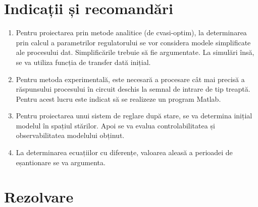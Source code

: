 \documentclass{article}
\begin{document}
\section{Indicații și recomandări}
\begin{enumerate}[label=\alph*)]
	\item Pentru proiectarea prin metode analitice (de cvasi-optim), la determinarea prin calcul a parametrilor regulatorului se vor considera modele simplificate ale procesului dat. Simplificările trebuie să fie argumentate. La simulări însă, se va utiliza funcția de transfer dată inițial.
	\item Pentru metoda experimentală, este necesară a procesare cât mai precisă a răspunsului procesului în circuit deschis la semnal de intrare de tip treaptă. Pentru acest lucru este indicat să se realizeze un program Matlab.
	\item Pentru proiectarea unui sistem de reglare după stare, se va determina inițial modelul în spațiul stărilor. Apoi se va evalua controlabilitatea și observabilitatea modelului obținut.
	\item La determinarea ecuațiilor cu diferențe, valoarea aleasă a perioadei de eșantionare se va argumenta.
\end{enumerate}

\section{Rezolvare}
\end{document}
